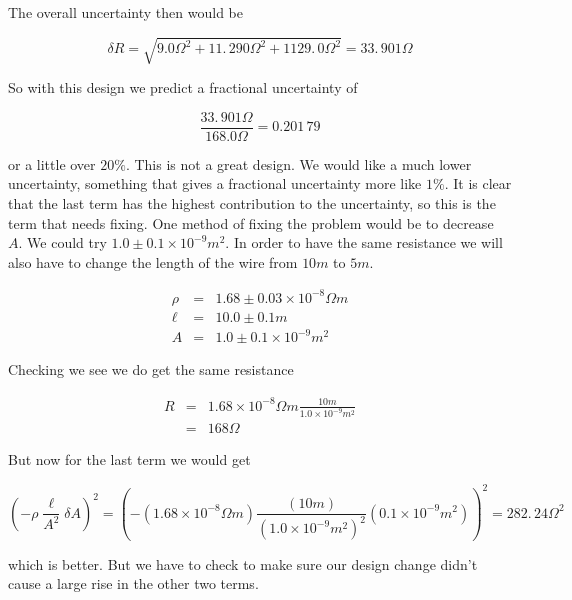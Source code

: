 \noindent The overall uncertainty then would be

\begin{equation*}
	\delta R=\sqrt{9.0\unit{\Omega}^{2}+11.\,\allowbreak 290\unit{\Omega}^{2}+1129.\,\allowbreak 0\unit{\Omega}^{2}}=33.\,\allowbreak 901\unit{\Omega}
\end{equation*}

So with this design we predict a fractional uncertainty of 

\begin{equation*}
	\frac{33.\,\allowbreak 901\unit{\Omega}}{168.0\unit{\Omega}}=0.201\,79
\end{equation*}

or a little over $20\%.$ This is not a great design. We would like a much lower uncertainty, something that gives a fractional uncertainty more like $1\%.$ It is clear that the last term has the highest contribution to the uncertainty, so this is the term that needs fixing. One method of fixing the problem would be to decrease $A.$ We could try $1.0\pm 0.1\times 10^{-9}\unit{m}^{2}.$ In order to have the same resistance we will also have to change the length of the wire from $10\unit{m}$ to $5\unit{m}$. 

\begin{eqnarray*}
	\rho &=&1.68\pm 0.03\times 10^{-8}\unit{\Omega}\unit{m} \\
	\ell &=&10.0\pm 0.1\unit{m} \\
	A &=&1.0\pm 0.1\times 10^{-9}\unit{m}^{2}
\end{eqnarray*}

Checking we see we do get the same resistance 

\begin{eqnarray*}
	R &=&1.68\times 10^{-8}\unit{\Omega	}\unit{m}\frac{10\unit{m}}{1.0\times 10^{-9}\unit{m}^{2}} \\
	&=&168\unit{\Omega}
\end{eqnarray*}

\noindent But now for the last term we would get 

\begin{equation*}
	\left( -\rho \frac{\ell }{A^{2}}\delta A\right) ^{2}=\left( -\left(
	1.68\times 10^{-8}\unit{\Omega}\unit{m}\right) \frac{\left( 10\unit{m}\right) }{\left( 1.0\times 10^{-9}\unit{m}^{2}\right) ^{2}}\left( 0.1\times 10^{-9}\unit{m}^{2}\right) \right)^{2}=282.\,\allowbreak 24\unit{\Omega}^{2}
\end{equation*}

\noindent which is better. But we have to check to make sure our design change didn't
cause a large rise in the other two terms. 

